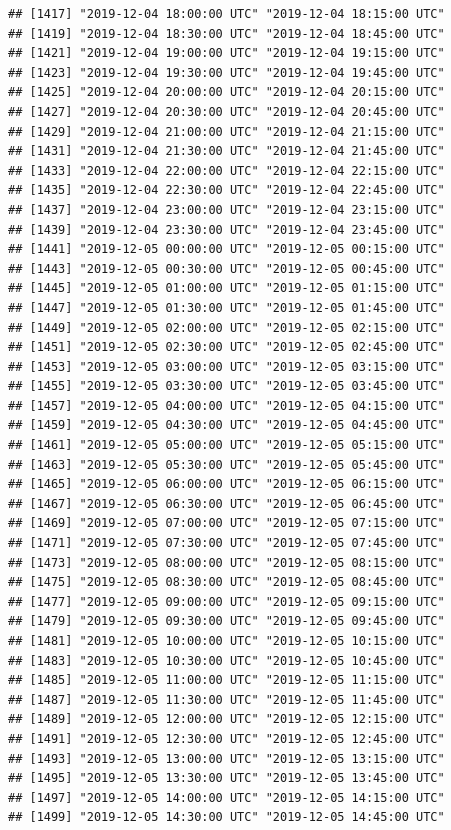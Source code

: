 \documentclass{article}\usepackage[]{graphicx}\usepackage[]{color}
\makeatletter
\newenvironment{kframe}{%
 \def\at@end@of@kframe{}%
 \ifinner\ifhmode%
  \def\at@end@of@kframe{\end{minipage}}%
  \begin{minipage}{\columnwidth}%
 \fi\fi%
 \def\FrameCommand##1{\hskip\@totalleftmargin \hskip-\fboxsep
 \colorbox{shadecolor}{##1}\hskip-\fboxsep
     \hskip-\linewidth \hskip-\@totalleftmargin \hskip\columnwidth}%
 \MakeFramed {\advance\hsize-\width
   \@totalleftmargin\z@ \linewidth\hsize
   \@setminipage}}%
 {\par\unskip\endMakeFramed%
 \at@end@of@kframe}
\newenvironment{knitrout}{}{} %
\makeatother
\begin{document}
\begin{knitrout}
\begin{kframe}
\begin{verbatim}
## [1417] "2019-12-04 18:00:00 UTC" "2019-12-04 18:15:00 UTC"
## [1419] "2019-12-04 18:30:00 UTC" "2019-12-04 18:45:00 UTC"
## [1421] "2019-12-04 19:00:00 UTC" "2019-12-04 19:15:00 UTC"
## [1423] "2019-12-04 19:30:00 UTC" "2019-12-04 19:45:00 UTC"
## [1425] "2019-12-04 20:00:00 UTC" "2019-12-04 20:15:00 UTC"
## [1427] "2019-12-04 20:30:00 UTC" "2019-12-04 20:45:00 UTC"
## [1429] "2019-12-04 21:00:00 UTC" "2019-12-04 21:15:00 UTC"
## [1431] "2019-12-04 21:30:00 UTC" "2019-12-04 21:45:00 UTC"
## [1433] "2019-12-04 22:00:00 UTC" "2019-12-04 22:15:00 UTC"
## [1435] "2019-12-04 22:30:00 UTC" "2019-12-04 22:45:00 UTC"
## [1437] "2019-12-04 23:00:00 UTC" "2019-12-04 23:15:00 UTC"
## [1439] "2019-12-04 23:30:00 UTC" "2019-12-04 23:45:00 UTC"
## [1441] "2019-12-05 00:00:00 UTC" "2019-12-05 00:15:00 UTC"
## [1443] "2019-12-05 00:30:00 UTC" "2019-12-05 00:45:00 UTC"
## [1445] "2019-12-05 01:00:00 UTC" "2019-12-05 01:15:00 UTC"
## [1447] "2019-12-05 01:30:00 UTC" "2019-12-05 01:45:00 UTC"
## [1449] "2019-12-05 02:00:00 UTC" "2019-12-05 02:15:00 UTC"
## [1451] "2019-12-05 02:30:00 UTC" "2019-12-05 02:45:00 UTC"
## [1453] "2019-12-05 03:00:00 UTC" "2019-12-05 03:15:00 UTC"
## [1455] "2019-12-05 03:30:00 UTC" "2019-12-05 03:45:00 UTC"
## [1457] "2019-12-05 04:00:00 UTC" "2019-12-05 04:15:00 UTC"
## [1459] "2019-12-05 04:30:00 UTC" "2019-12-05 04:45:00 UTC"
## [1461] "2019-12-05 05:00:00 UTC" "2019-12-05 05:15:00 UTC"
## [1463] "2019-12-05 05:30:00 UTC" "2019-12-05 05:45:00 UTC"
## [1465] "2019-12-05 06:00:00 UTC" "2019-12-05 06:15:00 UTC"
## [1467] "2019-12-05 06:30:00 UTC" "2019-12-05 06:45:00 UTC"
## [1469] "2019-12-05 07:00:00 UTC" "2019-12-05 07:15:00 UTC"
## [1471] "2019-12-05 07:30:00 UTC" "2019-12-05 07:45:00 UTC"
## [1473] "2019-12-05 08:00:00 UTC" "2019-12-05 08:15:00 UTC"
## [1475] "2019-12-05 08:30:00 UTC" "2019-12-05 08:45:00 UTC"
## [1477] "2019-12-05 09:00:00 UTC" "2019-12-05 09:15:00 UTC"
## [1479] "2019-12-05 09:30:00 UTC" "2019-12-05 09:45:00 UTC"
## [1481] "2019-12-05 10:00:00 UTC" "2019-12-05 10:15:00 UTC"
## [1483] "2019-12-05 10:30:00 UTC" "2019-12-05 10:45:00 UTC"
## [1485] "2019-12-05 11:00:00 UTC" "2019-12-05 11:15:00 UTC"
## [1487] "2019-12-05 11:30:00 UTC" "2019-12-05 11:45:00 UTC"
## [1489] "2019-12-05 12:00:00 UTC" "2019-12-05 12:15:00 UTC"
## [1491] "2019-12-05 12:30:00 UTC" "2019-12-05 12:45:00 UTC"
## [1493] "2019-12-05 13:00:00 UTC" "2019-12-05 13:15:00 UTC"
## [1495] "2019-12-05 13:30:00 UTC" "2019-12-05 13:45:00 UTC"
## [1497] "2019-12-05 14:00:00 UTC" "2019-12-05 14:15:00 UTC"
## [1499] "2019-12-05 14:30:00 UTC" "2019-12-05 14:45:00 UTC"

\end{verbatim}
\end{kframe}
\end{knitrout}
\end{document}

